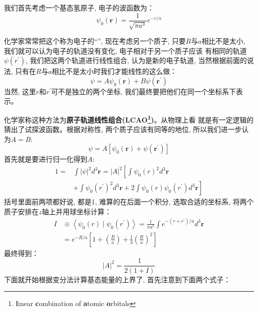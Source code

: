\documentclass[a4paper,zihao=-4,linespread=1]{ctexrep}
\begin{document}
    我们首先考虑一个基态氢原子, 电子的波函数为：
    \[\psi_0(\mathbf{r})=\frac{1}{\sqrt{\pi a^3}}e^{-r/a}\]
    
    化学家常常把这个称为电子的“”, 现在考虑另一个质子, 只要$R$与$a$相比不是太小, 我们就可以认为电子的轨道没有变化, 电子相对于另一个质子应该
    有相同的轨道$\psi(r^\prime)$, 我们把这两个轨道进行线性组合, 认为是新的电子轨道, 当然根据前面的说法, 只有在$R$与$a$相比不是太小时我们才能线性的这么做：
    \begin{equation}
        \psi = A\psi_0(\mathbf{r})+B\psi(\mathbf{r^\prime})
    \end{equation}
    当然, 这里$r$和$r^\prime$可不是独立的两个坐标, 我们最终要把他们在同一个坐标系下表示。

    化学家称这种方法为\textbf{原子轨道线性组合(LCAO\footnote{\textbf{l}inear \textbf{c}ombination of \textbf{a}tomic \textbf{o}rbitals})}。从物理上看
    就是有一定逻辑的猜出了试探波函数。根据对称性, 两个质子应该有同等的地位, 所以我们进一步认为$A=B$:
    \begin{equation}
        \label{eq:8.12}
        \psi = A\left[\psi_0(\mathbf{r})+\psi(\mathbf{r^\prime})\right]
    \end{equation}
    首先就是要进行归一化得到$A$:
    \begin{equation}
        \begin{aligned}
            1= & \int|\psi|^{2} d^{3} \mathbf{r}=|A|^{2}\left[\int \psi_{0}(r)^{2} d^{3} \mathbf{r}\right. \\
            & \left.+\int \psi_{0}\left(r^{\prime}\right)^{2} d^{3} \mathbf{r}+2 \int \psi_{0}(r) \psi_{0}\left(r^{\prime}\right) d^{3} \mathbf{r}\right]
        \end{aligned}
    \end{equation}
    括号里面前两项都好说, 都是1, 难算的在后面一个积分, 选取合适的坐标系, 将两个质子安排在$z$轴上并用球坐标计算：
    \begin{equation}
        \label{eq:8.14}
        \begin{aligned}
            I &\equiv\left\langle\psi_{0}(r) \mid \psi_{0}\left(r^{\prime}\right)\right\rangle=\frac{1}{\pi a^{3}} \int e^{-\left(r+r^{\prime}\right) / a} d^{3} \mathbf{r}\\
            &=e^{-R / a}\left[1+\left(\frac{R}{a}\right)+\frac{1}{3}\left(\frac{R}{a}\right)^{2}\right]
        \end{aligned}
    \end{equation}
    最终得到：
    \[|A|^{2}=\frac{1}{2(1+I)}\]
    下面就开始根据变分法计算基态能量的上界了, 首先注意到下面两个式子：
\end{document}
